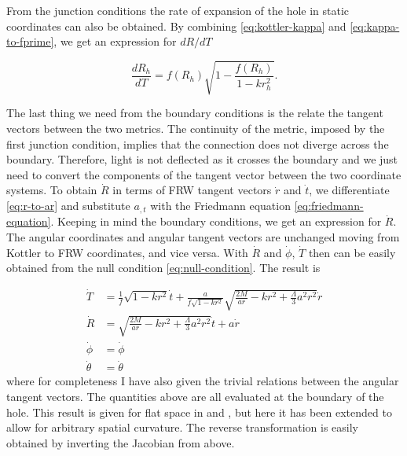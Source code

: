 From the junction conditions the rate of expansion of the hole in static coordinates can also be obtained. By combining \autoref{eq:kottler-kappa} and \autoref{eq:kappa-to-fprime}, we get an expression for $dR/dT$

\begin{equation}
  \frac{dR_h}{dT} = f(R_h) \sqrt{1- \frac{f(R_h)}{1-k r_h^2}}.
  \label{eq:hole-expansion-in-kottler-dR-dT}
\end{equation}

The last thing we need from the boundary conditions is the relate the tangent vectors between the two metrics. The continuity of the metric, imposed by the first junction condition, implies that the connection does not diverge across the boundary. Therefore, light is not deflected as it crosses the boundary and we just need to convert the components of the tangent vector between the two coordinate systems. To obtain $\dot{R}$ in terms of FRW tangent vectors $\dot{r}$ and $\dot{t}$, we differentiate \autoref{eq:r-to-ar} and substitute $a_{,t}$ with the Friedmann equation \autoref{eq:friedmann-equation}. Keeping in mind the boundary conditions, we get an expression for $\dot{R}$. The angular coordinates and angular tangent vectors are unchanged moving from Kottler to FRW coordinates, and vice versa. With $\dot{R}$ and $\dot{\phi}$, $\dot{T}$ then can be easily obtained from the null condition \autoref{eq:null-condition}. The result is

\begin{subequations}
  \begin{align}
    \dot{T} &= \frac{1}{f}\sqrt{1-kr^2} \dot{t} + \frac{a}{f\sqrt{1-kr^2}} \sqrt{\frac{2M}{ar} - kr^2 + \frac{\Lambda}{3}a^2 r^2} \dot{r} \\
    \dot{R} &= \sqrt{\frac{2M}{ar} - kr^2 + \frac{\Lambda}{3}a^2 r^2} \dot{t} + a\dot{r}\\
    \dot{\phi} &= \dot{\phi}\\
    \dot{\theta} &= \dot{\theta}
  \end{align}
  \label{eq:kottler-to-frw-transform-jacobian}
\end{subequations}
where for completeness I have also given the trivial relations between the angular tangent vectors. The quantities above are all evaluated at the boundary of the hole. This result is given for flat space in \citet{schucker2009strong} and \citet{fleury2013interpretation}, but here it has been extended to allow for arbitrary spatial curvature. The reverse transformation is easily obtained by inverting the Jacobian from above. 

